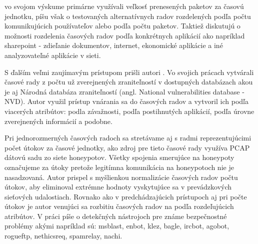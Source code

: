\documentclass[thesismargins, thesislinespacing, openright, upjsfrontpage, combineabstracts]{rnthesis}
\begin{document}
\cite{jiang2004detecting} vo svojom výskume primárne využívali veľkosť prenesených paketov za časovú jednotku, píšu však o testovaných alternatívnych radov rozdelených podľa počtu komunikujúcich používateľov alebo podľa počtu paketov. Taktiež diskutujú o možnosti rozdelenia časových radov podľa konkrétnych aplikácií ako napríklad sharepoint - zdieľanie dokumentov, internet, ekonomické aplikácie a iné analyzovateľné aplikácie v sieti.

S ďalším veľmi zaujímavým prístupom prišli autori \cite{tang2016exploiting,roumani2015time,tang2018disclosure,tang2017big,pokhrel2017cybersecurity,werner2017time}. Vo svojich prácach vytvárali časové rady z počtu už zverejnených zraniteľností v dostupných databázach akou je aj Národná databáza zraniteľností (angl. National vulnerabilities database - NVD). Autor \cite{roumani2015time} využil prístup vnárania sa do časových radov a vytvoril ich podľa viacerých atribútov: podla závažnosti, podľa postihnutých aplikácií, podľa úrovne zverejnených informácií a podobne.

Pri jednorozmerných časových radoch sa stretávame aj s radmi reprezentujúcimi počet útokov za časové jednotky, \cite{zhan2015predicting} ako zdroj pre tieto časové rady využíva PCAP dátovú sadu zo siete honeypotov. Všetky spojenia smerujúce na honeypoty označujeme za útoky pretože legitímna komunikácia na honeypotoch nie je nasadzovaná. Autor \cite{fang2019deep} prispel s myšlienkou normalizácie časových radov počtu útokov, aby eliminoval extrémne hodnoty vyskytujúce sa v prevádzkových sieťových udalostiach. Rovnako ako v predchádzajúcich prístupoch aj pri počte útokov je autor \cite{condon2008analysis} venujúci sa rozbitiu časových radov na podľa rozdeľujúcich atribútov. V práci píše o detekčných nástrojoch pre známe bezpečnostné problémy akými napríklad sú: msblast, enbot, klez,  bagle, ircbot, agobot, rogueftp, nethicsreq, spamrelay, nachi.
\end{document}
